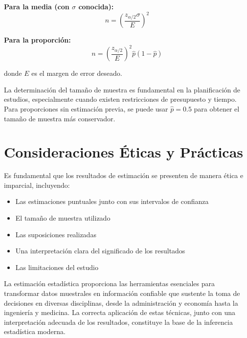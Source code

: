 \textbf{Para la media (con $\sigma$ conocida):}
\[
n = \left(\frac{z_{\alpha/2} \sigma}{E}\right)^2
\]

\textbf{Para la proporción:}
\[
n = \left(\frac{z_{\alpha/2}}{E}\right)^2 \hat{p}(1-\hat{p})
\]

donde $E$ es el margen de error deseado.

\begin{remark}
La determinación del tamaño de muestra es fundamental en la planificación de estudios, especialmente cuando existen restricciones de presupuesto y tiempo. Para proporciones sin estimación previa, se puede usar $\hat{p} = 0.5$ para obtener el tamaño de muestra más conservador.
\end{remark}

\section{Consideraciones Éticas y Prácticas}

\begin{remark}
Es fundamental que los resultados de estimación se presenten de manera ética e imparcial, incluyendo:
\begin{itemize}
\item Las estimaciones puntuales junto con sus intervalos de confianza
\item El tamaño de muestra utilizado
\item Las suposiciones realizadas
\item Una interpretación clara del significado de los resultados
\item Las limitaciones del estudio
\end{itemize}
\end{remark}

La estimación estadística proporciona las herramientas esenciales para transformar datos muestrales en información confiable que sustente la toma de decisiones en diversas disciplinas, desde la administración y economía hasta la ingeniería y medicina. La correcta aplicación de estas técnicas, junto con una interpretación adecuada de los resultados, constituye la base de la inferencia estadística moderna.
